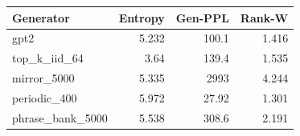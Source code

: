 \begin{tabular}{lrrr}
\toprule
Generator & Entropy & Gen-PPL & Rank-W \\
\midrule
gpt2 & 5.232 & 100.1 & 1.416 \\
top\_k\_iid\_64 & 3.64 & 139.4 & 1.535 \\
mirror\_5000 & 5.335 & 2993 & 4.244 \\
periodic\_400 & 5.972 & 27.92 & 1.301 \\
phrase\_bank\_5000 & 5.538 & 308.6 & 2.191 \\
\bottomrule
\end{tabular}
